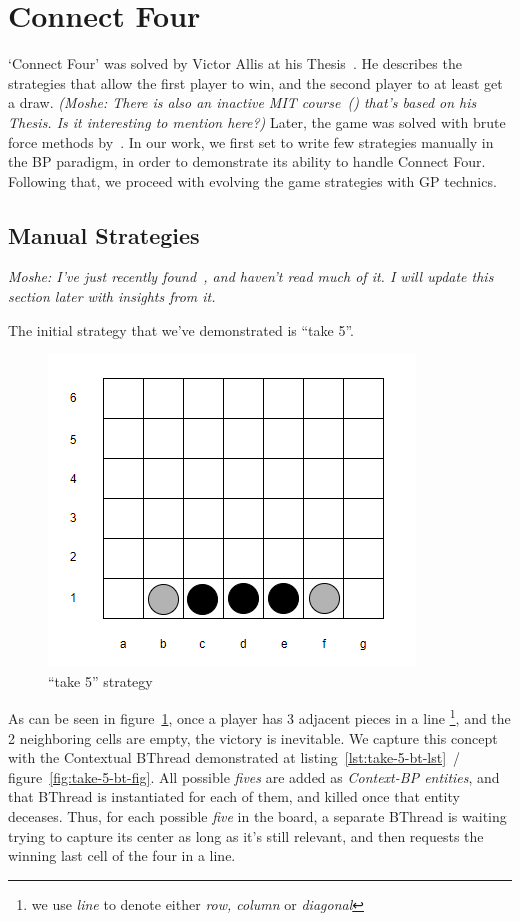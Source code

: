 \documentclass{article}
\begin{document}
    \section{Connect Four}
    `Connect Four' was solved by Victor Allis at his Thesis~\cite{Allis}.
    He describes the strategies that allow the first player to win, and the second player to at least get a draw.
    \emph{(Moshe: There is also an inactive MIT course~(\cite{Gymrek2009}) that's based on his Thesis. Is it interesting
    to mention here?)}
    Later, the game was solved with brute force methods by~\cite{Tromp}.
    In our work, we first set to write few strategies manually in the BP paradigm, in order to demonstrate its ability to
    handle Connect Four.
    Following that, we proceed with evolving the game strategies with GP technics.

    \subsection{Manual Strategies}
    \emph{Moshe: I've just recently found~\cite{Allis}, and haven't read much of it. I will update this section
    later with insights from it.}

    The initial strategy that we've demonstrated is ``take 5''.
    \begin{figure}[h]
        \includegraphics{five}
        \caption{``take 5'' strategy}
        \label{fig:take-5-strategy}
    \end{figure}
    As can be seen in figure~\ref{fig:take-5-strategy}, once a player has 3 adjacent pieces in a line \footnote{we use
    \emph{line} to denote either \emph{row, column} or \emph{diagonal}}, and the 2 neighboring cells are empty, the
    victory is inevitable. We capture this concept with the Contextual BThread demonstrated at
    listing~\ref{lst:take-5-bt-lst}~/~
    figure~\ref{fig:take-5-bt-fig}. All possible \emph{fives} are added as \emph{Context-BP entities}, and that BThread
    is instantiated for each of them, and killed once that entity deceases. Thus, for each possible \emph{five} in the
    board, a separate BThread is waiting trying to capture its center as long as it's still relevant, and then requests
    the winning last cell of the four in a line.
\end{document}

